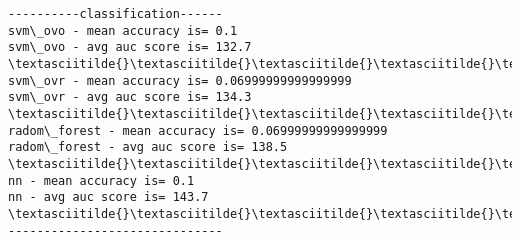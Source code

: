 \documentclass[11pt]{article}
\begin{document}
    \begin{Verbatim}[commandchars=\\\{\}]
----------classification------
svm\_ovo - mean accuracy is= 0.1
svm\_ovo - avg auc score is= 132.7
\textasciitilde{}\textasciitilde{}\textasciitilde{}\textasciitilde{}\textasciitilde{}\textasciitilde{}\textasciitilde{}\textasciitilde{}\textasciitilde{}\textasciitilde{}\textasciitilde{}\textasciitilde{}\textasciitilde{}\textasciitilde{}\textasciitilde{}\textasciitilde{}\textasciitilde{}\textasciitilde{}\textasciitilde{}\textasciitilde{}\textasciitilde{}\textasciitilde{}\textasciitilde{}\textasciitilde{}\textasciitilde{}\textasciitilde{}\textasciitilde{}\textasciitilde{}\textasciitilde{}
svm\_ovr - mean accuracy is= 0.06999999999999999
svm\_ovr - avg auc score is= 134.3
\textasciitilde{}\textasciitilde{}\textasciitilde{}\textasciitilde{}\textasciitilde{}\textasciitilde{}\textasciitilde{}\textasciitilde{}\textasciitilde{}\textasciitilde{}\textasciitilde{}\textasciitilde{}\textasciitilde{}\textasciitilde{}\textasciitilde{}\textasciitilde{}\textasciitilde{}\textasciitilde{}\textasciitilde{}\textasciitilde{}\textasciitilde{}\textasciitilde{}\textasciitilde{}\textasciitilde{}\textasciitilde{}\textasciitilde{}\textasciitilde{}\textasciitilde{}\textasciitilde{}
radom\_forest - mean accuracy is= 0.06999999999999999
radom\_forest - avg auc score is= 138.5
\textasciitilde{}\textasciitilde{}\textasciitilde{}\textasciitilde{}\textasciitilde{}\textasciitilde{}\textasciitilde{}\textasciitilde{}\textasciitilde{}\textasciitilde{}\textasciitilde{}\textasciitilde{}\textasciitilde{}\textasciitilde{}\textasciitilde{}\textasciitilde{}\textasciitilde{}\textasciitilde{}\textasciitilde{}\textasciitilde{}\textasciitilde{}\textasciitilde{}\textasciitilde{}\textasciitilde{}\textasciitilde{}\textasciitilde{}\textasciitilde{}\textasciitilde{}\textasciitilde{}
nn - mean accuracy is= 0.1
nn - avg auc score is= 143.7
\textasciitilde{}\textasciitilde{}\textasciitilde{}\textasciitilde{}\textasciitilde{}\textasciitilde{}\textasciitilde{}\textasciitilde{}\textasciitilde{}\textasciitilde{}\textasciitilde{}\textasciitilde{}\textasciitilde{}\textasciitilde{}\textasciitilde{}\textasciitilde{}\textasciitilde{}\textasciitilde{}\textasciitilde{}\textasciitilde{}\textasciitilde{}\textasciitilde{}\textasciitilde{}\textasciitilde{}\textasciitilde{}\textasciitilde{}\textasciitilde{}\textasciitilde{}\textasciitilde{}
------------------------------

    \end{Verbatim}
\end{document}
